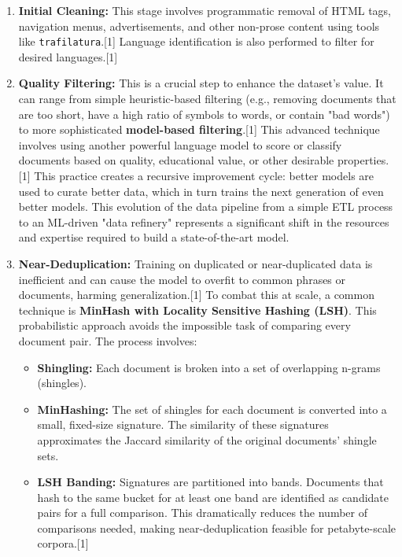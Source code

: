 \documentclass[12pt, a4paper]{article}
\begin{document}
\begin{enumerate}
    \item \textbf{Initial Cleaning:} This stage involves programmatic removal of HTML tags, navigation menus, advertisements, and other non-prose content using tools like \texttt{trafilatura}.[1] Language identification is also performed to filter for desired languages.[1]
    \item \textbf{Quality Filtering:} This is a crucial step to enhance the dataset's value. It can range from simple heuristic-based filtering (e.g., removing documents that are too short, have a high ratio of symbols to words, or contain "bad words") to more sophisticated \textbf{model-based filtering}.[1] This advanced technique involves using another powerful language model to score or classify documents based on quality, educational value, or other desirable properties.[1] This practice creates a recursive improvement cycle: better models are used to curate better data, which in turn trains the next generation of even better models. This evolution of the data pipeline from a simple ETL process to an ML-driven "data refinery" represents a significant shift in the resources and expertise required to build a state-of-the-art model.
    \item \textbf{Near-Deduplication:} Training on duplicated or near-duplicated data is inefficient and can cause the model to overfit to common phrases or documents, harming generalization.[1] To combat this at scale, a common technique is \textbf{MinHash with Locality Sensitive Hashing (LSH)}. This probabilistic approach avoids the impossible task of comparing every document pair. The process involves:
    \begin{itemize}
        \item \textbf{Shingling:} Each document is broken into a set of overlapping n-grams (shingles).
        \item \textbf{MinHashing:} The set of shingles for each document is converted into a small, fixed-size signature. The similarity of these signatures approximates the Jaccard similarity of the original documents' shingle sets.
        \item \textbf{LSH Banding:} Signatures are partitioned into bands. Documents that hash to the same bucket for at least one band are identified as candidate pairs for a full comparison. This dramatically reduces the number of comparisons needed, making near-deduplication feasible for petabyte-scale corpora.[1]
    \end{itemize}
\end{enumerate}
\end{document}
